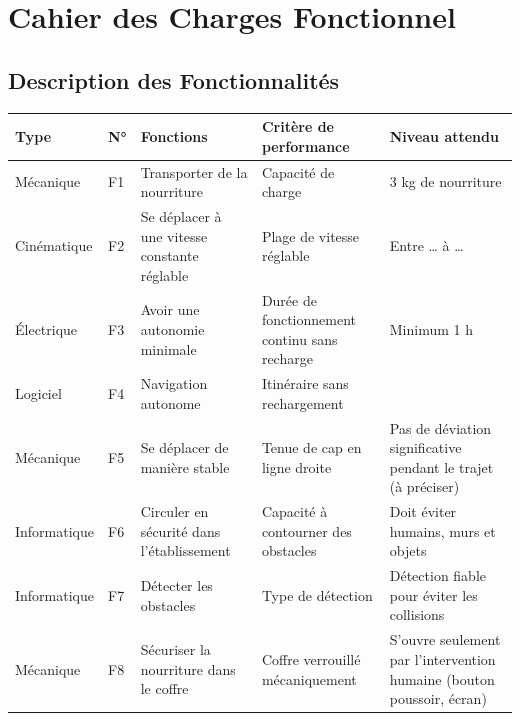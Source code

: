 \documentclass[a4paper,12pt]{report}  %
\begin{document}
\pagebreak
\section{Cahier des Charges Fonctionnel}

\subsection{Description des Fonctionnalités}

{\fontsize{10pt}{12pt}\selectfont 
	\begin{longtable}{|l|l|p{4cm}|p{4cm}|p{4cm}|}
		\hline
		\textbf{Type} & \textbf{N°} & \textbf{Fonctions} 
		& \textbf{Critère de performance} & \textbf{Niveau attendu} \\
		\hline
		\endhead
		
		\hline
		\endfoot
		
		\hline
		Mécanique & F1 & Transporter de la nourriture & Capacité de charge & 3 kg de nourriture  \\
		
		\hline
		Cinématique & F2 & Se déplacer à une vitesse constante réglable & Plage de vitesse réglable & Entre \ldots{} à \ldots{}  \\
		
		\hline
		Électrique & F3 & Avoir une autonomie minimale & Durée de fonctionnement continu sans recharge & Minimum 1 h  \\
		
		\hline
		Logiciel & F4 & Navigation autonome & Itinéraire sans rechargement & \\
		
		\hline
		Mécanique & F5 & Se déplacer de manière stable & Tenue de cap en ligne droite & Pas de déviation significative pendant le trajet (à préciser) \\
		
		\hline
		Informatique & F6 & Circuler en sécurité dans l'établissement & Capacité à contourner des obstacles & Doit éviter humains, murs et objets  \\
		
		\hline
		Informatique & F7 & Détecter les obstacles & Type de détection & Détection fiable pour éviter les collisions \\
		
		\hline
		Mécanique & F8 & Sécuriser la nourriture dans le coffre & Coffre verrouillé mécaniquement & S'ouvre seulement par l'intervention humaine (bouton poussoir, écran)  \\
		

\end{longtable}}
\end{document}
